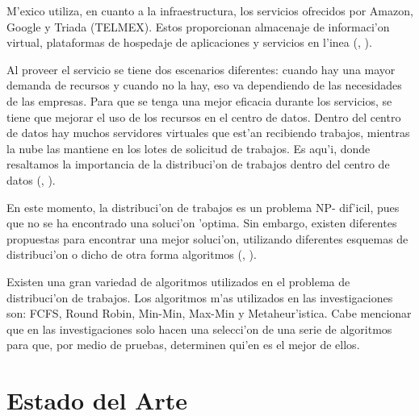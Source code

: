 M'exico utiliza, en cuanto a la infraestructura, los servicios ofrecidos por Amazon, Google y Triada (TELMEX). Estos proporcionan almacenaje de informaci'on virtual, plataformas de hospedaje de aplicaciones y servicios en l'inea (\citeauthor{mariscal2013computo}, \citeyear{mariscal2013computo}).

Al proveer el servicio se tiene dos escenarios diferentes: cuando hay una mayor demanda de recursos y cuando no la hay,  eso va dependiendo de las necesidades de las empresas. 
Para que se tenga una mejor eficacia durante los servicios, se tiene que mejorar el uso de los recursos en el centro de datos. Dentro del centro de datos hay muchos servidores virtuales que est'an recibiendo trabajos, mientras la nube las mantiene en los lotes de solicitud de trabajos. Es aqu'i, donde resaltamos la importancia de la distribuci'on de trabajos dentro del centro de datos (\citeauthor{shimpy2014different}, \citeyear{shimpy2014different}). 

En este momento, la distribuci'on de trabajos es un problema NP- dif'icil, pues que no se ha encontrado una soluci'on 'optima. Sin embargo, existen diferentes propuestas para encontrar una mejor soluci'on, utilizando diferentes esquemas de distribuci'on o dicho de otra forma algoritmos (\citeauthor{shimpy2014different}, \citeyear{shimpy2014different}). 

Existen una gran variedad de algoritmos utilizados en el problema de distribuci'on de trabajos. Los algoritmos m'as utilizados en las investigaciones son: FCFS, Round Robin, Min-Min, Max-Min y Metaheur'istica. Cabe mencionar que en las investigaciones solo hacen una selecci'on de una serie de algoritmos para que, por medio de pruebas, determinen qui'en es el mejor de ellos. 


\newpage
\section{Estado del Arte}


